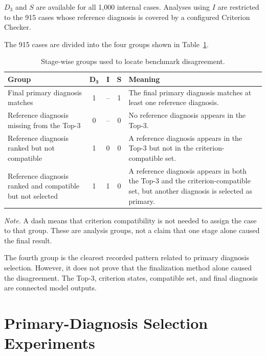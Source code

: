 \documentclass[12pt,a4paper,oneside]{report}
\begin{document}
$D_3$ and $S$ are available for all 1,000 internal cases. Analyses using
$I$ are restricted to the 915 cases whose reference diagnosis is covered
by a configured Criterion Checker.

The 915 cases are divided into the four groups shown in
Table~\ref{tab:disagreement-groups}.

\begin{table}[H]
\centering
\caption{Stage-wise groups used to locate benchmark disagreement.}
\label{tab:disagreement-groups}
\small
\renewcommand{\arraystretch}{1.12}
\begin{tabularx}{\textwidth}
{|>{\raggedright\arraybackslash}p{4.5cm}|
 c|c|c|
 >{\raggedright\arraybackslash}X|}
\hline
\textbf{Group} &
$\boldsymbol{D_3}$ &
$\boldsymbol{I}$ &
$\boldsymbol{S}$ &
\textbf{Meaning}\\
\hline
Final primary diagnosis matches &
1 & -- & 1 &
The final primary diagnosis matches at least one reference diagnosis.\\
\hline
Reference diagnosis missing from the Top-3 &
0 & -- & 0 &
No reference diagnosis appears in the Top-3.\\
\hline
Reference diagnosis ranked but not compatible &
1 & 0 & 0 &
A reference diagnosis appears in the Top-3 but not in the
criterion-compatible set.\\
\hline
Reference diagnosis ranked and compatible but not selected &
1 & 1 & 0 &
A reference diagnosis appears in both the Top-3 and the
criterion-compatible set, but another diagnosis is selected as primary.\\
\hline
\end{tabularx}
\renewcommand{\arraystretch}{1.0}

\parbox{0.96\textwidth}{\footnotesize
\textit{Note.} A dash means that criterion compatibility is not needed
to assign the case to that group. These are analysis groups, not a claim
that one stage alone caused the final result.
}
\end{table}

The fourth group is the clearest recorded pattern related to primary
diagnosis selection. However, it does not prove that the finalization
method alone caused the disagreement. The Top-3, criterion states,
compatible set, and final diagnosis are connected model outputs.

\section{Primary-Diagnosis Selection Experiments}
\label{sec:primary-selection-intervention-design}
\end{document}
